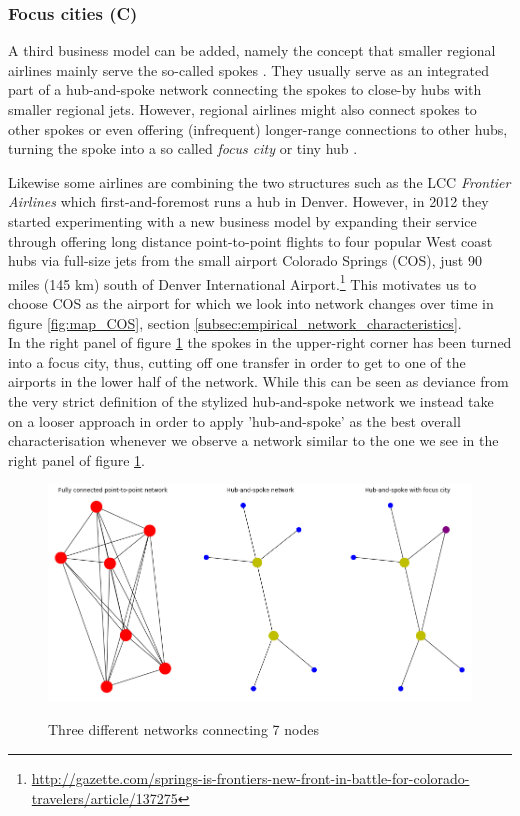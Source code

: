 \subsubsection{Focus cities (C)}
\label{subsec:focus_cities}
A third business model can be added, namely the concept that smaller regional airlines mainly serve the so-called spokes \citep{forbes2007role}. They usually serve as an integrated part of a hub-and-spoke network connecting the spokes to close-by hubs with smaller regional jets. However, regional airlines might also connect spokes to other spokes or even offering (infrequent) longer-range connections to other hubs, turning the spoke into a so called \textit{focus city} or tiny hub \citep{mammarella2014encyclopedia}.
\par
Likewise some airlines are combining the two structures such as the LCC \textit{Frontier Airlines} which first-and-foremost runs a hub in Denver. However, in 2012 they started experimenting with a new business model by expanding their service through offering long distance point-to-point flights to four popular West coast hubs via full-size jets from the small airport Colorado Springs (COS), just 90 miles (145 km) south of Denver International Airport.\footnote{\href{https://web.archive.org/web/20160526231749/http://gazette.com/springs-is-frontiers-new-front-in-battle-for-colorado-travelers/article/137275}{http://gazette.com/springs-is-frontiers-new-front-in-battle-for-colorado-travelers/article/137275}} This motivates us to choose COS as the airport for which we look into network changes over time in figure \ref{fig:map_COS}, section \ref{subsec:empirical_network_characteristics}.
\medskip\\
In the right panel of figure \ref{fig:different_networks} the spokes in the upper-right corner has been turned into a focus city, thus, cutting off one transfer in order to get to one of the airports in the lower half of the network. While this can be seen as deviance from the very strict definition of the stylized hub-and-spoke network \citep{o1987quadratic} we instead take on a looser approach in order to apply 'hub-and-spoke' as the best  overall characterisation whenever we observe a network similar to the one we see in the right panel of figure \ref{fig:different_networks}.
\begin{figure}[H]
  \centering
  \caption{Three different networks connecting 7 nodes}
    \includegraphics[width=\linewidth]{Exam/Figures/network_types}
    \vspace{-0.7cm}
  \label{fig:different_networks}
\end{figure}

